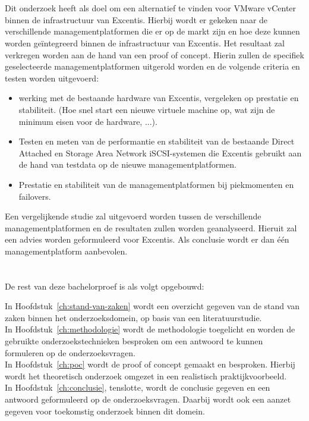 \section{}%
\label{sec:onderzoeksdoelstelling}
Dit onderzoek heeft als doel om een alternatief te vinden voor VMware vCenter binnen de infrastructuur van Excentis. Hierbij wordt er gekeken naar de verschillende managementplatformen die er op de markt zijn en hoe deze kunnen worden geïntegreerd binnen de infrastructuur van Excentis.
Het resultaat zal verkregen worden aan de hand van een proof of concept. Hierin zullen de specifiek geselecteerde managementplatformen uitgerold worden en de volgende criteria en testen worden uitgevoerd:
\begin{itemize}
  \item werking met de bestaande hardware van Excentis, vergeleken op prestatie en stabiliteit. (Hoe snel start een nieuwe virtuele machine op, wat zijn de minimum eisen voor de hardware, ...).
  \item Testen en meten van de performantie en stabiliteit van de bestaande Direct Attached en Storage Area Network iSCSI-systemen die Excentis gebruikt aan de hand van testdata op de nieuwe managementplatformen.
  \item Prestatie en stabiliteit van de managementplatformen bij piekmomenten en failovers.
\end{itemize}
Een vergelijkende studie zal uitgevoerd worden tussen de verschillende managementplatformen en de resultaten zullen worden geanalyseerd. Hieruit zal een advies worden geformuleerd voor Excentis.
Als conclusie wordt er dan één managementplatform aanbevolen.


\section{}%
\label{sec:opzet-bachelorproef}


De rest van deze bachelorproef is als volgt opgebouwd:

In Hoofdstuk~\ref{ch:stand-van-zaken} wordt een overzicht gegeven van de stand van zaken binnen het onderzoeksdomein, op basis van een literatuurstudie. \\
In Hoofdstuk~\ref{ch:methodologie} wordt de methodologie toegelicht en worden de gebruikte onderzoekstechnieken besproken om een antwoord te kunnen formuleren op de onderzoeksvragen. \\
In Hoofdstuk~\ref{ch:poc} wordt de proof of concept gemaakt en besproken. Hierbij wordt het theoretisch onderzoek omgezet in een realistisch praktijkvoorbeeld. \\
In Hoofdstuk~\ref{ch:conclusie}, tenslotte, wordt de conclusie gegeven en een antwoord geformuleerd op de onderzoeksvragen. Daarbij wordt ook een aanzet gegeven voor toekomstig onderzoek binnen dit domein.